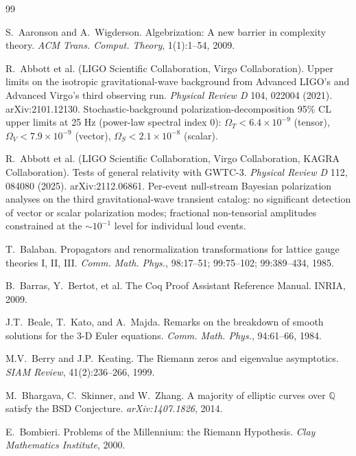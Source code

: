 \documentclass[11pt,a4paper]{amsart}
\theoremstyle{plain}
\theoremstyle{definition}
\begin{document}
\begin{thebibliography}{99}

S.~Aaronson and A.~Wigderson.
\newblock Algebrization: A new barrier in complexity theory.
\newblock \emph{ACM Trans. Comput. Theory}, 1(1):1--54, 2009.

R.~Abbott et al. (LIGO Scientific Collaboration, Virgo Collaboration).
\newblock Upper limits on the isotropic gravitational-wave background from Advanced LIGO's and Advanced Virgo's third observing run.
\newblock \emph{Physical Review D} 104, 022004 (2021). arXiv:2101.12130. Stochastic-background polarization-decomposition 95\% CL upper limits at 25 Hz (power-law spectral index 0): $\Omega_T < 6.4 \times 10^{-9}$ (tensor), $\Omega_V < 7.9 \times 10^{-9}$ (vector), $\Omega_S < 2.1 \times 10^{-8}$ (scalar).

R.~Abbott et al. (LIGO Scientific Collaboration, Virgo Collaboration, KAGRA Collaboration).
\newblock Tests of general relativity with GWTC-3.
\newblock \emph{Physical Review D} 112, 084080 (2025). arXiv:2112.06861. Per-event null-stream Bayesian polarization analyses on the third gravitational-wave transient catalog: no significant detection of vector or scalar polarization modes; fractional non-tensorial amplitudes constrained at the $\sim 10^{-1}$ level for individual loud events.

T.~Balaban.
\newblock Propagators and renormalization transformations for lattice gauge theories I, II, III.
\newblock \emph{Comm. Math. Phys.}, 98:17--51; 99:75--102; 99:389--434, 1985.

B.~Barras, Y.~Bertot, et al.
\newblock The Coq Proof Assistant Reference Manual.
\newblock INRIA, 2009.

J.T.~Beale, T.~Kato, and A.~Majda.
\newblock Remarks on the breakdown of smooth solutions for the 3-D Euler equations.
\newblock \emph{Comm. Math. Phys.}, 94:61--66, 1984.

M.V.~Berry and J.P.~Keating.
\newblock The Riemann zeros and eigenvalue asymptotics.
\newblock \emph{SIAM Review}, 41(2):236--266, 1999.

M.~Bhargava, C.~Skinner, and W.~Zhang.
\newblock A majority of elliptic curves over $\mathbb{Q}$ satisfy the BSD Conjecture.
\newblock \emph{arXiv:1407.1826}, 2014.

E.~Bombieri.
\newblock Problems of the Millennium: the Riemann Hypothesis.
\newblock \emph{Clay Mathematics Institute}, 2000.


\end{thebibliography}
\end{document}
